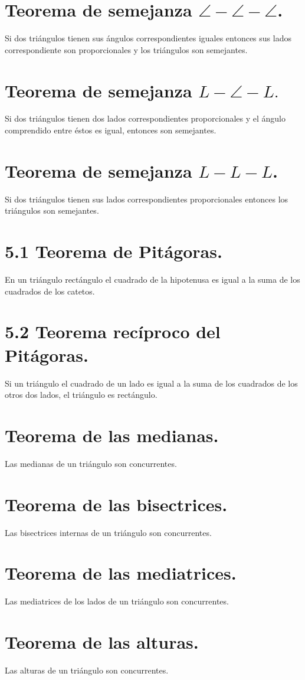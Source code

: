\documentclass[12pt,a4paper,oneside]{book}
\begin{document}
\section{Teorema de semejanza $\angle -\angle -\angle$.}
Si dos triángulos tienen sus ángulos correspondientes iguales entonces sus lados correspondiente son proporcionales y los triángulos son semejantes.
\section{Teorema de semejanza $L-\angle - L.$}
Si dos triángulos tienen dos lados correspondientes proporcionales y el ángulo comprendido entre éstos es igual, entonces son semejantes.
\section{Teorema de semejanza $L-L-L$.}
Si dos triángulos tienen sus lados correspondientes proporcionales entonces los triángulos son semejantes.
\section{5.1 Teorema de Pitágoras.}
En un triángulo rectángulo el cuadrado de la hipotenusa es igual a la suma de los cuadrados de los catetos.
\section{5.2 Teorema recíproco del Pitágoras.}
Si un triángulo el cuadrado de un lado es igual a la suma de los cuadrados de los otros dos lados, el triángulo es rectángulo.
\section{Teorema de las medianas.}
Las medianas de un triángulo son concurrentes.
\section{Teorema de las bisectrices.}
Las bisectrices internas de un triángulo son concurrentes.
\section{Teorema de las mediatrices.}
Las mediatrices de los lados de un triángulo son concurrentes.
\section{Teorema de las alturas.}
Las alturas de un triángulo son concurrentes.
\end{document}
